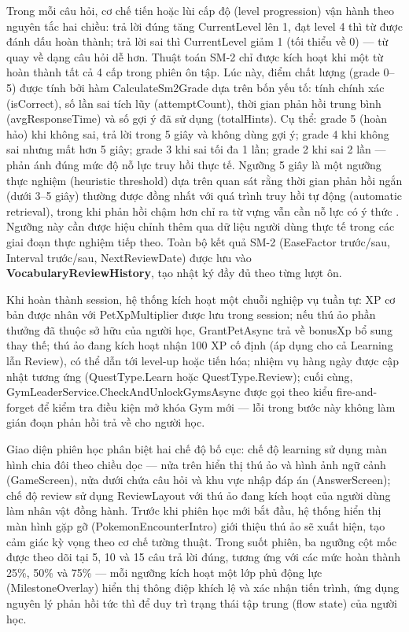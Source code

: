 Trong mỗi câu hỏi, cơ chế tiến hoặc lùi cấp độ (level progression) vận hành theo nguyên tắc hai chiều: trả lời đúng tăng CurrentLevel lên 1, đạt level 4 thì từ được đánh dấu hoàn thành; trả lời sai thì CurrentLevel giảm 1 (tối thiểu về 0) — từ quay về dạng câu hỏi dễ hơn. Thuật toán SM-2 chỉ được kích hoạt khi một từ hoàn thành tất cả 4 cấp trong phiên ôn tập. Lúc này, điểm chất lượng (grade 0–5) được tính bởi hàm CalculateSm2Grade dựa trên bốn yếu tố: tính chính xác (isCorrect), số lần sai tích lũy (attemptCount), thời gian phản hồi trung bình (avgResponseTime) và số gợi ý đã sử dụng (totalHints). Cụ thể: grade 5 (hoàn hảo) khi không sai, trả lời trong 5 giây và không dùng gợi ý; grade 4 khi không sai nhưng mất hơn 5 giây; grade 3 khi sai tối đa 1 lần; grade 2 khi sai 2 lần — phản ánh đúng mức độ nỗ lực truy hồi thực tế. Ngưỡng 5 giây là một ngưỡng thực nghiệm (heuristic threshold) dựa trên quan sát rằng thời gian phản hồi ngắn (dưới 3--5 giây) thường được đồng nhất với quá trình truy hồi tự động (automatic retrieval), trong khi phản hồi chậm hơn chỉ ra từ vựng vẫn cần nỗ lực có ý thức \cite{Carpenter2012}. Ngưỡng này cần được hiệu chỉnh thêm qua dữ liệu người dùng thực tế trong các giai đoạn thực nghiệm tiếp theo. Toàn bộ kết quả SM-2 (EaseFactor trước/sau, Interval trước/sau, NextReviewDate) được lưu vào \textbf{VocabularyReviewHistory}, tạo nhật ký đầy đủ theo từng lượt ôn.

Khi hoàn thành session, hệ thống kích hoạt một chuỗi nghiệp vụ tuần tự: XP cơ bản được nhân với PetXpMultiplier được lưu trong session; nếu thú ảo phần thưởng đã thuộc sở hữu của người học, GrantPetAsync trả về bonusXp bổ sung thay thế; thú ảo đang kích hoạt nhận 100 XP cố định (áp dụng cho cả Learning lẫn Review), có thể dẫn tới level-up hoặc tiến hóa; nhiệm vụ hàng ngày được cập nhật tương ứng (QuestType.Learn hoặc QuestType.Review); cuối cùng, GymLeaderService.CheckAndUnlockGymsAsync được gọi theo kiểu fire-and-forget để kiểm tra điều kiện mở khóa Gym mới — lỗi trong bước này không làm gián đoạn phản hồi trả về cho người học.

Giao diện phiên học phân biệt hai chế độ bố cục: chế độ learning sử dụng màn hình chia đôi theo chiều dọc — nửa trên hiển thị thú ảo và hình ảnh ngữ cảnh (GameScreen), nửa dưới chứa câu hỏi và khu vực nhập đáp án (AnswerScreen); chế độ review sử dụng ReviewLayout với thú ảo đang kích hoạt của người dùng làm nhân vật đồng hành. Trước khi phiên học mới bắt đầu, hệ thống hiển thị màn hình gặp gỡ (PokemonEncounterIntro) giới thiệu thú ảo sẽ xuất hiện, tạo cảm giác kỳ vọng theo cơ chế tường thuật. Trong suốt phiên, ba ngưỡng cột mốc được theo dõi tại 5, 10 và 15 câu trả lời đúng, tương ứng với các mức hoàn thành 25\%, 50\% và 75\% — mỗi ngưỡng kích hoạt một lớp phủ động lực (MilestoneOverlay) hiển thị thông điệp khích lệ và xác nhận tiến trình, ứng dụng nguyên lý phản hồi tức thì để duy trì trạng thái tập trung (flow state) của người học.

